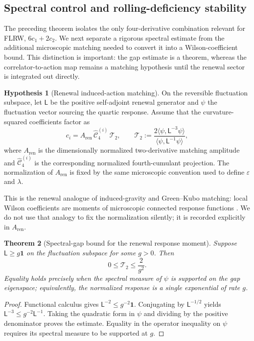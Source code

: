 \documentclass[11pt]{article}
\newtheorem{theorem}{Theorem}[section]
\theoremstyle{definition}
\newtheorem{hypothesis}[theorem]{Hypothesis}
\theoremstyle{remark}
\newcommand{\eps}{\varepsilon}
\newcommand{\ren}{\mathrm{ren}}
\newcommand{\Lop}{\mathsf L}
\begin{document}
\subsection{Spectral control and rolling-deficiency stability}
\label{subsec:gap-and-rolling-flatness}

The preceding theorem isolates the only four-derivative combination relevant
for FLRW, $6c_1+2c_2$.  We next separate a rigorous spectral estimate from the
additional microscopic matching needed to convert it into a Wilson-coefficient
bound.  This distinction is important: the gap estimate is a theorem, whereas
the correlator-to-action map remains a matching hypothesis until the renewal
sector is integrated out directly.

\begin{hypothesis}[Renewal induced-action matching]
\label{hyp:renewal-induced-matching}
On the reversible fluctuation subspace, let $\Lop$ be the positive
self-adjoint renewal generator and $\psi$ the fluctuation vector sourcing the
quartic response.  Assume that the curvature-squared coefficients factor as
\[
 c_i=A_{\ren}\,\widehat{\mathcal C}^{(i)}_4\,\mathcal T_2,
 \qquad
 \mathcal T_2:=
 \frac{2\langle\psi,\Lop^{-3}\psi\rangle}
      {\langle\psi,\Lop^{-1}\psi\rangle},
\]
where $A_{\ren}$ is the dimensionally normalized two-derivative matching
amplitude and $\widehat{\mathcal C}^{(i)}_4$ is the corresponding normalized
fourth-cumulant projection.  The normalization of $A_{\ren}$ is fixed by the
same microscopic convention used to define $\eps$ and $\lambda$.
\end{hypothesis}

This is the renewal analogue of induced-gravity and Green--Kubo matching:
local Wilson coefficients are moments of microscopic connected response
functions \cite{Sakharov1968,Adler1982,Zee1981,KipnisVaradhan}.  We do not use
that analogy to fix the normalization silently; it is recorded explicitly in
$A_{\ren}$.

\begin{theorem}[Spectral-gap bound for the renewal response moment]
\label{thm:renewal-gap-moment}
Suppose $\Lop\ge g\mathbf 1$ on the fluctuation subspace for some $g>0$.
Then
\[
 0\le\mathcal T_2\le\frac{2}{g^2}.
\]
Equality holds precisely when the spectral measure of $\psi$ is supported on
the gap eigenspace; equivalently, the normalized response is a single
exponential of rate $g$.
\end{theorem}

\begin{proof}
Functional calculus gives $\Lop^{-2}\le g^{-2}\mathbf 1$.  Conjugating by
$\Lop^{-1/2}$ yields $\Lop^{-3}\le g^{-2}\Lop^{-1}$.  Taking the quadratic
form in $\psi$ and dividing by the positive denominator proves the estimate.
Equality in the operator inequality on $\psi$ requires its spectral measure to
be supported at $g$.
\end{proof}
\end{document}
